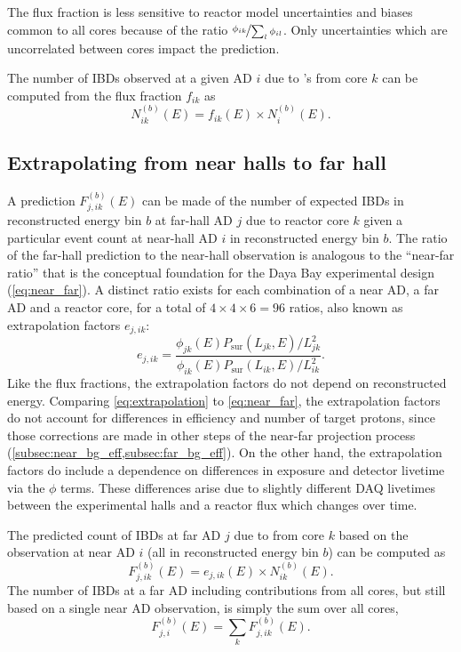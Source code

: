 The flux fraction is less sensitive to reactor \nuebar{} model uncertainties and biases
common to all cores
because of the ratio $\nicefrac{\phi_{ik}}{\sum_l\phi_{il}}$.
Only uncertainties which are uncorrelated between cores
impact the prediction.

The number of IBDs observed at a given AD $i$ due to \nuebar{}'s from core $k$
can be computed from the flux fraction $f_{ik}$ as
\begin{equation}\label{eq:num_ibds_from_core_ij}
    N_{ik}^{(b)}(E) = f_{ik}(E) \times N_i^{(b)}(E).
\end{equation}

\subsection{Extrapolating from near halls to far hall}
\label{subsec:extrapolation}

A prediction $F_{j,ik}^{(b)}(E)$ can be made of the number of expected IBDs
in reconstructed energy bin $b$
at far-hall AD $j$ due to reactor core $k$
given a particular event count at near-hall AD $i$ in reconstructed energy bin $b$.
The ratio of the far-hall prediction to the near-hall observation
is analogous to the ``near-far ratio''
that is the conceptual foundation
for the Daya Bay experimental design (\cref{eq:near_far}).
A distinct ratio exists for each combination of a near AD, a far AD and a reactor core,
for a total of $4 \times 4 \times 6 = 96$ ratios, also known as extrapolation factors
$e_{j,ik}$:
\begin{equation}\label{eq:extrapolation}
    e_{j,ik} = \frac{\phi_{jk}(E)P_\text{sur}(L_{jk}, E)/L_{jk}^2}{
        \phi_{ik}(E)P_\text{sur}(L_{ik}, E)/L_{ik}^2
    }.
\end{equation}
Like the flux fractions, the extrapolation factors
do not depend on reconstructed energy.
Comparing \cref{eq:extrapolation} to \cref{eq:near_far}, the extrapolation factors
do not account for differences in efficiency and number of target protons,
since those corrections are made in other steps of the near-far projection process
(\cref{subsec:near_bg_eff,subsec:far_bg_eff}).
On the other hand, the extrapolation factors do include a dependence on
differences in \nuebar{} exposure and detector livetime via the $\phi$ terms.
These differences arise due to slightly different DAQ livetimes
between the experimental halls
and a reactor flux which changes over time.

The predicted count of IBDs at far AD $j$ due to \nuebar{} from core $k$
based on the observation at near AD $i$ (all in reconstructed energy bin $b$) can be computed as
\begin{equation}
    F_{j,ik}^{(b)}(E) = e_{j,ik}(E) \times N_{ik}^{(b)}(E).
\end{equation}
The number of IBDs at a far AD including contributions from all cores,
but still based on a single near AD observation,
is simply the sum over all cores,
\begin{equation}
    F_{j,i}^{(b)}(E) = \sum_k F_{j,ik}^{(b)}(E).
\end{equation}

